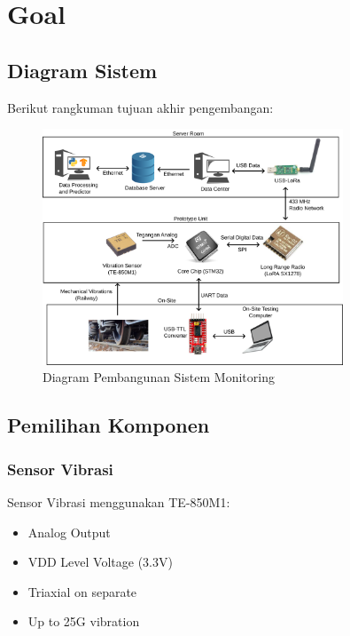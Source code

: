 \documentclass{book} %
\begin{document}
	\newpage
	\chapter{Goal}
	
	\section{Diagram Sistem}
	
	Berikut rangkuman tujuan akhir pengembangan:
	
	\begin{figure}[!ht]
		\centering
		\includegraphics[width=0.8\textwidth]{images/goal_diagram/goal}
		\caption{Diagram Pembangunan Sistem Monitoring}
	\end{figure}
	
	\section{Pemilihan Komponen}
	
	\subsection{Sensor Vibrasi}
	
	Sensor Vibrasi menggunakan TE-850M1:
	
	\begin{itemize}
		\item Analog Output 
		\item VDD Level Voltage (3.3V)
		\item Triaxial on separate
		\item Up to 25G vibration
	\end{itemize}
	
	\newpage
\end{document}
